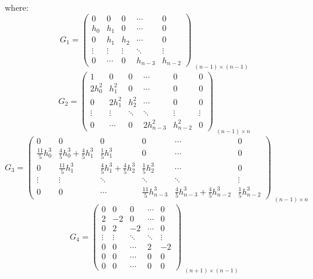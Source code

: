 \documentclass{article}
\begin{document}
where:
\[
G_1 =
\begin{pmatrix}
0 & 0 & 0 & \cdots & 0 \\
h_0 & h_1 & 0 & \cdots & 0 \\
0 & h_1 & h_2 & \cdots & 0 \\
\vdots & \vdots & \vdots & \ddots & \vdots \\
0 & \cdots & 0 & h_{n-3} & h_{n-2}
\end{pmatrix}_{\substack{\text{\((n-1)\times(n-1)\)}}}
\]
\[
G_2 =
\begin{pmatrix}
1 & 0 & 0 & \cdots & 0 & 0\\
2h_0^2 & h_1^2 & 0 & \cdots & 0 & 0 \\
0 & 2h_1^2 & h_2^2 & \cdots & 0 & 0 \\
\vdots & \vdots & \ddots & \ddots & \vdots & \vdots\\
0 & \cdots & 0 & 2h_{n-3}^2 & h_{n-2}^2 & 0
\end{pmatrix}_{\substack{\text{\((n-1)\times n\)}}}
\]
\[
G_3 =
\begin{pmatrix}
0 & 0 & 0 & 0 & \cdots & 0 \\
\frac{11}{5}h_0^3 & \frac{4}{5}h_0^3+\frac{4}{5}h_1^3 & \frac{1}{5}h_1^3 & 0 & \cdots & 0 \\
0 & \frac{11}{5}h_1^3 & \frac{4}{5}h_1^3+\frac{4}{5}h_2^3 & \frac{1}{5}h_2^3 & \cdots & 0 \\
\vdots & \vdots & \ddots & \ddots & \ddots & \vdots\\
0 & 0 & \cdots & \frac{11}{5}h_{n-3}^3 & \frac{4}{5}h_{n-3}^3+\frac{4}{5}h_{n-2}^3 & \frac{1}{5}h_{n-2}^3
\end{pmatrix}_{\substack{\text{\((n-1)\times n\)}}}
\]
\[
G_4 =
\begin{pmatrix}
0 & 0 & 0 & \cdots & 0 \\
2 & -2 & 0 & \cdots & 0 \\
0 & 2 & -2 & \cdots & 0 \\
\vdots & \vdots & \ddots & \ddots & \vdots \\
0 & 0 & \cdots & 2 & -2 \\
0 & 0 & \cdots & 0 & 0 \\
0 & 0 & \cdots & 0 & 0
\end{pmatrix}_{\substack{\text{\((n+1)\times(n-1)\)}}}
\]
\end{document}
